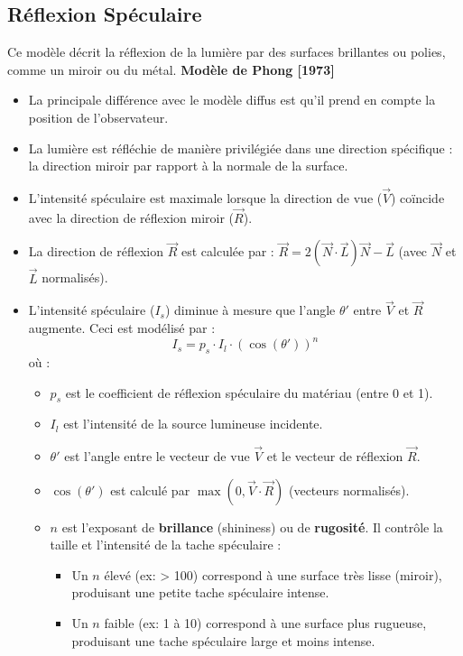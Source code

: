 \subsection{Réflexion Spéculaire}
Ce modèle décrit la réflexion de la lumière par des surfaces brillantes ou polies, comme un miroir ou du métal.
\textbf{Modèle de Phong [1973]}
\begin{itemize}
    \item La principale différence avec le modèle diffus est qu'il prend en compte la position de l'observateur.
    \item La lumière est réfléchie de manière privilégiée dans une direction spécifique : la direction miroir par rapport à la normale de la surface.
    \item L'intensité spéculaire est maximale lorsque la direction de vue (\(\vec{V}\)) coïncide avec la direction de réflexion miroir (\(\vec{R}\)).
    \item La direction de réflexion \(\vec{R}\) est calculée par : \(\vec{R} = 2(\vec{N} \cdot \vec{L})\vec{N} - \vec{L}\) (avec \(\vec{N}\) et \(\vec{L}\) normalisés).
    \item L'intensité spéculaire (\(I_s\)) diminue à mesure que l'angle \(\theta'\) entre \(\vec{V}\) et \(\vec{R}\) augmente. Ceci est modélisé par :
    \[ I_s = p_s \cdot I_l \cdot (\cos(\theta'))^n \]
    où :
        \begin{itemize}
            \item \(p_s\) est le coefficient de réflexion spéculaire du matériau (entre 0 et 1).
            \item \(I_l\) est l'intensité de la source lumineuse incidente.
            \item \(\theta'\) est l'angle entre le vecteur de vue \(\vec{V}\) et le vecteur de réflexion \(\vec{R}\).
            \item \(\cos(\theta')\) est calculé par \(\max(0, \vec{V} \cdot \vec{R})\) (vecteurs normalisés).
            \item \(n\) est l'exposant de \textbf{brillance} (shininess) ou de \textbf{rugosité}. Il contrôle la taille et l'intensité de la tache spéculaire :
                \begin{itemize}
                    \item Un \(n\) élevé (ex: > 100) correspond à une surface très lisse (miroir), produisant une petite tache spéculaire intense.
                    \item Un \(n\) faible (ex: 1 à 10) correspond à une surface plus rugueuse, produisant une tache spéculaire large et moins intense.
                \end{itemize}
        \end{itemize}
\end{itemize}
